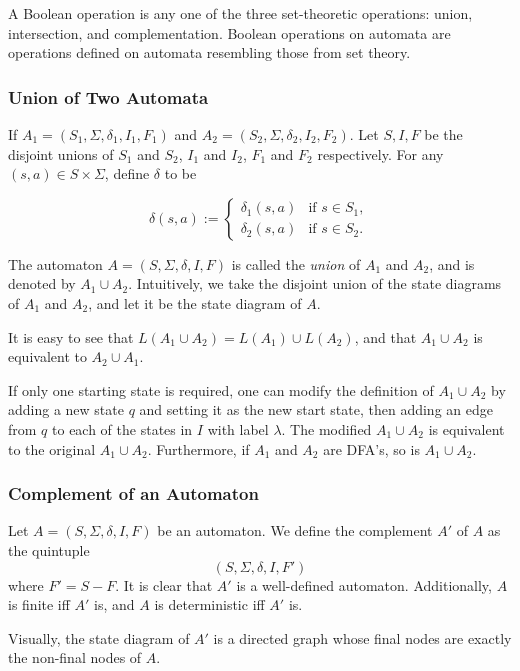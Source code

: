 \documentclass[12pt]{article}
\begin{document}
A Boolean operation is any one of the three set-theoretic operations: union, intersection, and complementation.  Boolean operations on automata are operations defined on automata resembling those from set theory.

\subsubsection*{Union of Two Automata}
If $A_1=(S_1,\Sigma,\delta_1,I_1,F_1)$ and $A_2=(S_2,\Sigma,\delta_2,I_2,F_2)$.  Let $S,I,F$ be the disjoint unions of $S_1$ and $S_2$, $I_1$ and $I_2$, $F_1$ and $F_2$ respectively.  For any $(s,a)\in S\times \Sigma$, define $\delta$ to be 

\begin{displaymath}
\delta(s,a):= \left\{
\begin{array}{ll}
\delta_1(s,a) & \textrm{if }s\in S_1, \\
\delta_2(s,a) & \textrm{if }s\in S_2.
\end{array}
\right.
\end{displaymath}

The automaton $A=(S,\Sigma,\delta,I,F)$ is called the \emph{union} of $A_1$ and $A_2$, and is denoted by $A_1 \cup A_2$.  Intuitively, we take the disjoint union of the state diagrams of $A_1$ and $A_2$, and let it be the state diagram of $A$.

It is easy to see that $L(A_1\cup A_2)=L(A_1)\cup L(A_2)$, and that $A_1\cup A_2$ is equivalent to $A_2\cup A_1$.

If only one starting state is required, one can modify the definition of $A_1\cup A_2$ by adding a new state $q$ and setting it as the new start state, then adding an edge from $q$ to each of the states in $I$ with label $\lambda$.  The modified $A_1\cup A_2$ is equivalent to the original $A_1\cup A_2$.  Furthermore, if $A_1$ and $A_2$ are DFA's, so is $A_1\cup A_2$.

\subsubsection*{Complement of an Automaton}

Let $A=(S,\Sigma,\delta,I,F)$ be an automaton.  We define the complement $A'$ of $A$ as the quintuple $$(S,\Sigma,\delta,I,F')$$ where $F'=S-F$.  It is clear that $A'$ is a well-defined automaton.  Additionally, $A$ is finite iff $A'$ is, and $A$ is deterministic iff $A'$ is.  

Visually, the state diagram of $A'$ is a directed graph whose final nodes are exactly the non-final nodes of $A$.
\end{document}

